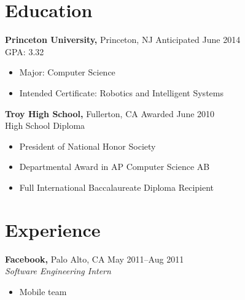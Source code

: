 \documentclass[margin]{res}
\begin{document}
 
 

\address{{\bf Present Address} \\ 3169 Frist Center \\ Princeton, NJ
  08544 \\ (714) 869-7503 \\ dan@dskang.com }

\address{{\bf Permanent Address} \\ 2507 Cypress Point Drive \\
  Fullerton, CA 92833 }

 
\begin{resume} 
 
\section{Education} 
 {\bf Princeton University,} Princeton, NJ \hfill Anticipated June
 2014 \\ GPA: 3.32
 \begin{itemize} \itemsep -2pt %
 \item Major: Computer Science
 \item Intended Certificate: Robotics and Intelligent Systems
 \end{itemize}

 {\bf Troy High School,} Fullerton, CA \hfill Awarded June 2010 \\
 High School Diploma
 \begin{itemize} \itemsep -2pt %
 \item President of National Honor Society
 \item Departmental Award in AP Computer Science AB
 \item Full International Baccalaureate Diploma Recipient
 \end{itemize}



\section{Experience}
 {\bf Facebook,} Palo Alto, CA \hfill May 2011--Aug 2011 \\
 {\it Software Engineering Intern}
 \begin{itemize} \itemsep -2pt  %
 \item Mobile team
 \end{itemize}


\end{resume}
\end{document}

